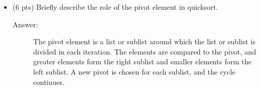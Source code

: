 \documentclass[11pt]{article}
\begin{document}
\begin{itemize}
\item (6 pts) Briefly describe the role of the pivot element in quicksort.
\begin{description}
    \item[Answer:] The pivot element is a list or sublist around which the list or sublist is divided in each iteration. The elements are compared to the pivot, and greater elements form the right sublist and smaller elements form the left sublist. A new pivot is chosen for each sublist, and the cycle continues.
\end{description}
\end{itemize}
\end{document}
